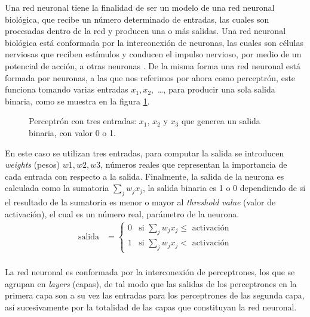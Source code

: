 \documentclass{iccmemoria}
\begin{document}
Una red neuronal tiene la finalidad de ser un modelo de una red neuronal biológica, que recibe un número determinado de entradas, las cuales son procesadas dentro de la red y producen una o más salidas. Una red neuronal biológica está conformada por la interconexión de neuronas, las cuales son células nerviosas que reciben estímulos y conducen el impulso nervioso, por medio de un potencial de acción, a otras neuronas \cite{cayre2002common}. De la misma forma una red neuronal está formada por neuronas, a las que nos referimos por ahora como perceptrón, este funciona tomando varias entradas $ x_{1}, x_{2}, $ \dots, para producir una sola salida binaria, como se muestra en la figura \ref{fig:perceptron}.\\

\begin{figure}[H]
  \centering
  \begin{Large}
  
  \end{Large}
  \caption{Perceptrón con tres entradas: $x_{1}$, $x_{2}$ y $x_{3}$ que generea un salida binaria, con valor 0 o 1.}
  \label{fig:perceptron}
\end{figure}

En este caso se utilizan tres entradas, para computar la salida se introducen \emph{weights} (pesos) $w1, w2, w3$, números reales que representan la importancia de cada entrada con respecto a la salida. Finalmente, la salida de la neurona es calculada como la sumatoria $ \sum_{j}{} w_{j} x_{j}$, la salida binaria es 1 o 0 dependiendo de si el resultado de la sumatoria es menor o mayor al \emph{threshold value} (valor de activación), el cual es un número real, parámetro de la neurona.\\

\begin{equation}
	\begin{split}
	\mbox{salida} & = \begin{cases}
		0 & \mbox{si } \sum_j w_j x_j \leq  \mbox{ activación}\\
		1 & \mbox{si } \sum_j w_j x_j <  \mbox{ activación}
		\end{cases}
	\end{split}
\end{equation}\\


La red neuronal es conformada por la interconexión de perceptrones, los que se agrupan en \emph{layers} (capas), de tal modo que las salidas de los perceptrones en la primera capa son a su vez las entradas para los perceptrones de las segunda capa, así sucesivamente por la totalidad de las capas que constituyan la red neuronal.\\
\end{document}
